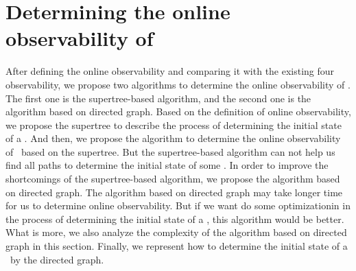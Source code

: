 \section{Determining the online observability of \BCNs}
\label{sec:deter}
After defining the online observability and comparing it with the existing four observability, we propose two algorithms to determine the online observability of \BCNs. The first one is the supertree-based algorithm, and the second one is the algorithm based on directed graph. Based on the definition of online observability, we propose the supertree to describe the process of determining the initial state of a \BCN. And then, we propose the algorithm to determine the online observability of \BCNs\ based on the supertree. But the supertree-based algorithm can not help us find all paths to determine the initial state of some \BCNs. In order to improve the shortcomings of the supertree-based algorithm, we propose the algorithm based on directed graph. The algorithm based on directed graph may take longer time for us to determine online observability. But if we want do some optimizationin in the process of determining the initial state of a \BCN, this algorithm would be better. What is more, we also analyze the complexity of the algorithm based on directed graph in this section. Finally, we represent how to determine the initial state of a \BCN\ by the directed graph.

